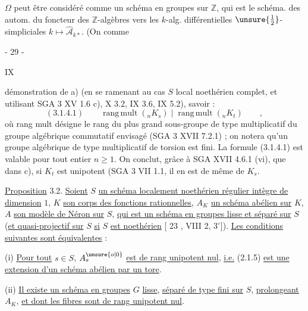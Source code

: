  $\Omega$ peut être considéré comme un schéma
en groupes sur $\mathbb Z$, qui est le schéma.
des autom. du foncteur des $\mathbb Z$-algèbres
vers les $k$-alg. différentielles $\unsure{\tfrac12}$-simpliciales
$k\longmapsto\widehat{\mathcal A}_{k*}$. (On  comme 
\begin{center}- 29 -\end{center}\hfill IX

démonstration de a) (en se ramenant au cas $S$ local noethérien complet,
et utilisant SGA 3 XV 1.6 c), X 3.2, IX 3.6, IX 5.2), savoir :
\[
 (3.1.4.1)\qquad\operatorname{rang\,mult}({}_nK_s)\mid
 \operatorname{rang\,mult}({}_nK_t)\qquad,
\]
où rang mult désigne le rang du plus grand sous-groupe de type multiplicatif du groupe algébrique commutatif envisagé (SGA 3 XVII 7.2.1) ;
on notera qu'un groupe algébrique de type multiplicatif de torsion est
fini. La formule (3.1.4.1) est valable pour tout entier $n\geq1$. On
conclut, grâce à SGA XVII 4.6.1 (vi), que dans c), si $K_t$ est unipotent
(SGA 3 VII 1.1, il en est de même de $K_s$.

\uline{Proposition} 3.2. \uline{Soient} $S$ \uline{un schéma localement noethérien régulier
intègre de dimension} $1$, $K$ \uline{son corps des fonctions rationnelles}, $A_K$
\uline{un schéma abélien sur} $K$, $A$ \uline{son modèle de Néron sur} $S$, \uline{qui est un
schéma en groupes lisse et séparé sur} $S$ (\uline{et quasi-projectif sur} $S$
\uline{si} $S$ \uline{est noethérien} [ 23 , VIII 2, $3^\circ$]). \uline{Les conditions suivantes
sont équivalentes} :

(i) \uline{Pour tout} $s\in S$, $A_s^{\unsure{o|0}}$ \uline{est de rang unipotent nul}, \uline{i.e.}
(2.1.5) \uline{est une extension d'un schéma abélien par un tore}.

(ii) \uline{Il existe un schéma en groupes} $G$ \uline{lisse}, \uline{séparé de type
fini sur} $S$, \uline{prolongeant} $A_K$, \uline{et dont les fibres sont de rang unipotent nul}.

